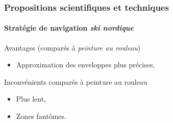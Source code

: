 \documentclass{beamer}
\begin{document}
			\begin{frame}
				\frametitle{Propositions scientifiques et techniques}
				\framesubtitle{Stratégie de navigation \textit{ski nordique}}
				\begin{exampleblock}{Avantages (comparés à \textit{peinture au rouleau})}
					\begin{itemize}
						\item Approximation des enveloppes plus précises,
					\end{itemize}
				\end{exampleblock}
				\begin{alertblock}{Inconvénients comparés à peinture au rouleau}
					\begin{itemize}
						\item Plus lent,
						\item Zones fantômes.
					\end{itemize}
				\end{alertblock}
			\end{frame}
\end{document}
